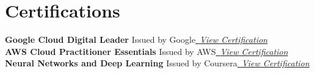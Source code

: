 \documentclass[letterpaper,11pt]{article}
\begin{document}
\section{Certifications}
\textbf{Google Cloud Digital Leader}\hspace{179pt} {Issued by Google}\hfill \textit{\href{https://drive.google.com/file/d/1MAo409atYlEc0r7xfwe3ebBejDC5iZs-/view?usp=sharing}{\raisebox{2\width}\ {View Certification}}}
        \vspace{0pt}    \\ %
\textbf{AWS Cloud Practitioner Essentials} \hspace{140pt} {Issued by AWS}\hfill \textit{\href{https://drive.google.com/file/d/1lySTuNABZx2dk_KQR1cARGCU_EWt64Nj/view?usp=drive_link}{\raisebox{2\width}\ {View Certification}}}
        \vspace{0pt} \\
\textbf{Neural Networks and Deep Learning} \hspace{140pt} {Issued by Coursera}\hfill \textit{\href{https://drive.google.com/file/d/15HHSLo_F_7ToUwS7QXiaLBuu74pYt8YA/view?usp=sharing}{\raisebox{2\width}\ {View Certification}}}
        \vspace{0pt}
\end{document}
